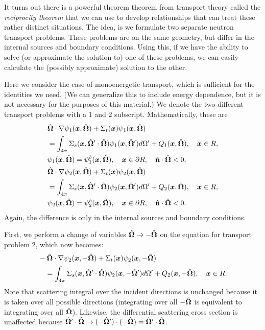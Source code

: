 It turns out there is a powerful theorem theorem from transport theory called the \emph{reciprocity theorem} that we can use to develop relationships that can treat these rather distinct situations. The idea, is we formulate two separate neutron transport problems. These problems are on the same geometry, but differ in the internal sources and boundary conditions. Using this, if we have the ability to solve (or approximate the solution to) one of these problems, we can easily calculate the (possibly approximate) solution to the other. 

Here we consider the case of monoenergetic transport, which is sufficient for the identities we need. (We can generalize this to include energy dependence, but it is not necessary for the purposes of this material.) We denote the two different transport problems with a 1 and 2 subscript. Mathematically, these are
\begin{subequations}
\begin{align}
  &\hat{\mathbf{\Omega}} \cdot \nabla \psi_1(\bm{x},\hat{\mathbf{\Omega}}) + \Sigma_t(\bm{x}) \psi_1(\bm{x},\hat{\mathbf{\Omega}}) \nonumber \\
  &= \int_{4\pi} \Sigma_s(\bm{x},\hat{\mathbf{\Omega}}' \cdot \hat{\mathbf{\Omega}}) \psi_1(\bm{x},\hat{\mathbf{\Omega}}') d\Omega' + Q_1(\bm{x},\hat{\mathbf{\Omega}}), \quad \bm{x} \in R, \\*
  &\psi_1(\bm{x},\hat{\mathbf{\Omega}}) = \psi_1^b(\bm{x},\hat{\mathbf{\Omega}}), \quad \bm{x} \in \partial R, \quad \hat{\mathbf{n}} \cdot \hat{\mathbf{\Omega}} < 0, \\
  &\hat{\mathbf{\Omega}} \cdot \nabla \psi_2(\bm{x},\hat{\mathbf{\Omega}}) + \Sigma_t(\bm{x}) \psi_2(\bm{x},\hat{\mathbf{\Omega}}) \nonumber \\
  &= \int_{4\pi} \Sigma_s(\bm{x},\hat{\mathbf{\Omega}}' \cdot \hat{\mathbf{\Omega}}) \psi_2(\bm{x},\hat{\mathbf{\Omega}}') d\Omega' + Q_2(\bm{x},\hat{\mathbf{\Omega}}), \quad \bm{x} \in R, \\*
  &\psi_2(\bm{x},\hat{\mathbf{\Omega}}) = \psi_2^b(\bm{x},\hat{\mathbf{\Omega}}), \quad \bm{x} \in \partial R, \quad \hat{\mathbf{n}} \cdot \hat{\mathbf{\Omega}} < 0 .
\end{align}
\end{subequations} 
Again, the difference is only in the internal sources and boundary conditions.

First, we perform a change of variables $\hat{\mathbf{\Omega}} \rightarrow -\hat{\mathbf{\Omega}}$ on the equation for transport problem 2, which now becomes:
\begin{align}
  &-\hat{\mathbf{\Omega}} \cdot \nabla \psi_2(\bm{x},-\hat{\mathbf{\Omega}}) + \Sigma_t(\bm{x}) \psi_2(\bm{x},-\hat{\mathbf{\Omega}}) \nonumber \\*
  &\quad = \int_{4\pi} \Sigma_s(\bm{x},\hat{\mathbf{\Omega}}' \cdot \hat{\mathbf{\Omega}}) \psi_2(\bm{x},-\hat{\mathbf{\Omega}}') d\Omega' + Q_2(\bm{x},-\hat{\mathbf{\Omega}}), \quad \bm{x} \in R .
\end{align}
Note that scattering integral over the incident directions is unchanged because it is taken over all possible directions (integrating over all $-\hat{\mathbf{\Omega}}$ is equivalent to integrating over all $\hat{\mathbf{\Omega}}$). Likewise, the differential scattering cross section is unaffected because $\hat{\mathbf{\Omega}}' \cdot \hat{\mathbf{\Omega}} \rightarrow (-\hat{\mathbf{\Omega}}') \cdot (-\hat{\mathbf{\Omega}}) = \hat{\mathbf{\Omega}}' \cdot \hat{\mathbf{\Omega}}$.

